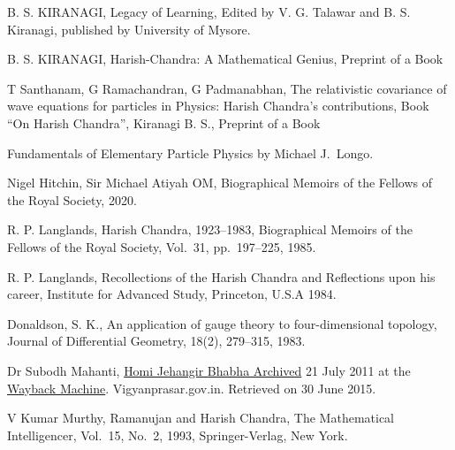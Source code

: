 \begin{thebibliography}{99}
\itemsep=0pt
 B. S. KIRANAGI, Legacy of Learning, Edited by V. G. Talawar and B. S. Kiranagi, published by University of Mysore.

 B. S. KIRANAGI, Harish-Chandra: A Mathematical Genius, Preprint of a Book 

 T Santhanam, G Ramachandran, G Padmanabhan, The relativistic covariance of wave equations for particles in Physics: Harish Chandra's contributions, Book ``On Harish Chandra”, Kiranagi B. S., Preprint of a Book

 Fundamentals of Elementary Particle Physics by Michael J.\ Longo.

 Nigel Hitchin, Sir Michael Atiyah OM, Biographical Memoirs of the Fellows of the Royal Society, 2020.

 R. P. Langlands, Harish Chandra, 1923--1983, Biographical Memoirs of the Fellows of the Royal Society, Vol.\ 31, pp.\ 197--225, 1985.

 R. P. Langlands, Recollections of the Harish Chandra and Reflections upon his career, Institute for Advanced Study, Princeton, U.S.A 1984.

 Donaldson, S. K., An application of gauge theory to four-dimensional topology, Journal of Differential Geometry, 18(2), 279--315, 1983.

 Dr Subodh Mahanti,  \underline{Homi Jehangir Bhabha Archived} 21 July 2011 at the \underline{Wayback Machine}. Vigyanprasar.gov.in. Retrieved on 30 June 2015.

 V Kumar Murthy, Ramanujan and Harish Chandra, The Mathematical Intelligencer, Vol.\ 15, No.\ 2, 1993, Springer-Verlag, New York.

\end{thebibliography}
\vskip 1cm

